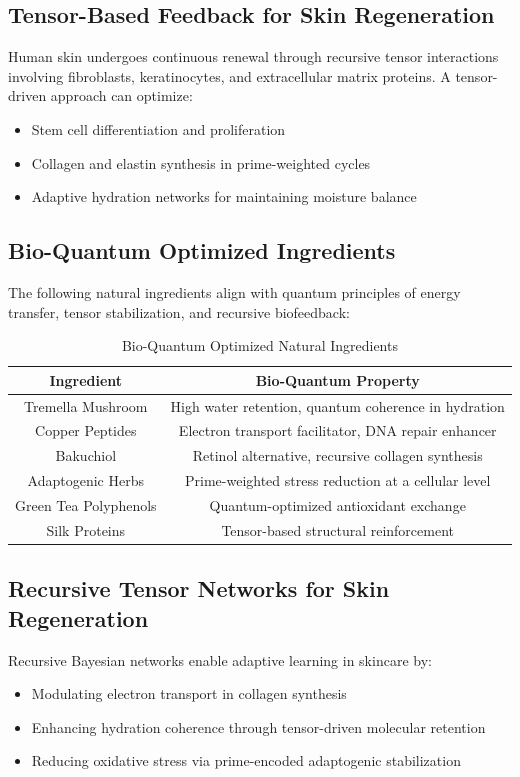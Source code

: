 \documentclass{article}
\theoremstyle{plain}
\theoremstyle{claimstyle}
\begin{document}
\subsection{Tensor-Based Feedback for Skin Regeneration}
Human skin undergoes continuous renewal through recursive tensor interactions involving fibroblasts, keratinocytes, and extracellular matrix proteins. A tensor-driven approach can optimize:
\begin{itemize}
    \item Stem cell differentiation and proliferation
    \item Collagen and elastin synthesis in prime-weighted cycles
    \item Adaptive hydration networks for maintaining moisture balance
\end{itemize}

\subsection{Bio-Quantum Optimized Ingredients}
The following natural ingredients align with quantum principles of energy transfer, tensor stabilization, and recursive biofeedback:
\begin{table}[h]
    \centering
    \begin{tabular}{|c|c|}
        \hline
        \textbf{Ingredient} & \textbf{Bio-Quantum Property} \\
        \hline
        Tremella Mushroom & High water retention, quantum coherence in hydration \\
        Copper Peptides & Electron transport facilitator, DNA repair enhancer \\
        Bakuchiol & Retinol alternative, recursive collagen synthesis \\
        Adaptogenic Herbs & Prime-weighted stress reduction at a cellular level \\
        Green Tea Polyphenols & Quantum-optimized antioxidant exchange \\
        Silk Proteins & Tensor-based structural reinforcement \\
        \hline
    \end{tabular}
    \caption{Bio-Quantum Optimized Natural Ingredients}
\end{table}

\subsection{Recursive Tensor Networks for Skin Regeneration}
Recursive Bayesian networks enable adaptive learning in skincare by:
\begin{itemize}
    \item Modulating electron transport in collagen synthesis
    \item Enhancing hydration coherence through tensor-driven molecular retention
    \item Reducing oxidative stress via prime-encoded adaptogenic stabilization
\end{itemize}
\end{document}
